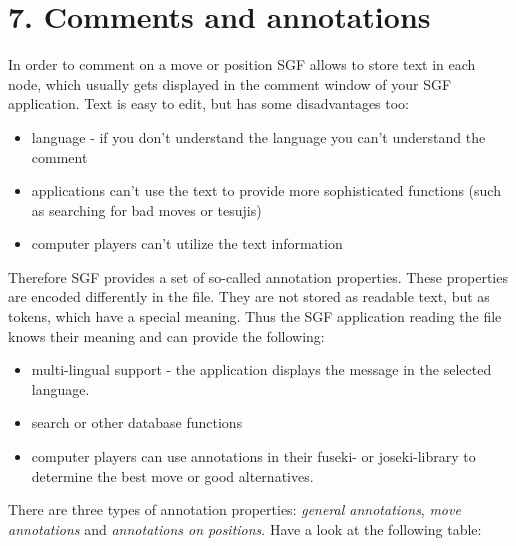\section{7. Comments and annotations}\label{comments-and-annotations}

In order to comment on a move or position SGF allows to store text in
each node, which usually gets displayed in the comment window of your
SGF application. Text is easy to edit, but has some disadvantages too:

\begin{itemize}
\item
  language - if you don't understand the language you can't understand
  the comment
\item
  applications can't use the text to provide more sophisticated
  functions (such as searching for bad moves or tesujis)
\item
  computer players can't utilize the text information
\end{itemize}

Therefore SGF provides a set of so-called annotation properties. These
properties are encoded differently in the file. They are not stored as
readable text, but as tokens, which have a special meaning. Thus the SGF
application reading the file knows their meaning and can provide the
following:

\begin{itemize}
\item
  multi-lingual support - the application displays the message in the
  selected language.
\item
  search or other database functions
\item
  computer players can use annotations in their fuseki- or
  joseki-library to determine the best move or good alternatives.
\end{itemize}

There are three types of annotation properties: \emph{general
annotations}, \emph{move annotations} and \emph{annotations on
positions}. Have a look at the following table:

